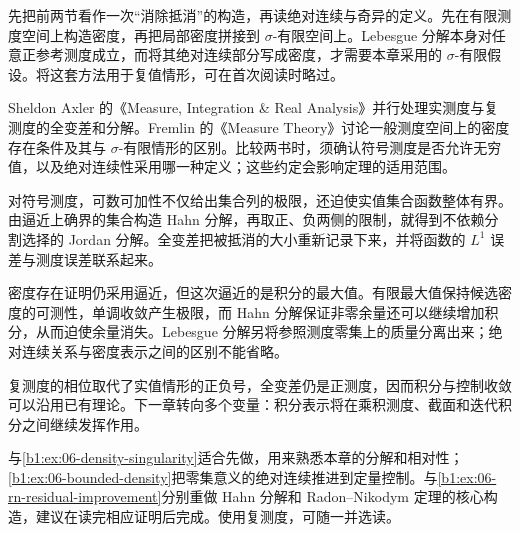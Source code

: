 先把前两节看作一次“消除抵消”的构造，再读绝对连续与奇异的定义。先在有限测度空间上构造密度，再把局部密度拼接到 \(\sigma\)-有限空间上。Lebesgue 分解本身对任意正参考测度成立，而将其绝对连续部分写成密度，才需要本章采用的 \(\sigma\)-有限假设。将这套方法用于复值情形，可在首次阅读时略过。

\ProseParagraphBreak

Sheldon Axler 的《Measure, Integration \& Real Analysis》\cite[Chapter 9]{Axler2020Measure}并行处理实测度与复测度的全变差和分解。Fremlin 的《Measure Theory》\cite[Volume 2, \S\S231--232]{Fremlin2016Measure}讨论一般测度空间上的密度存在条件及其与 \(\sigma\)-有限情形的区别。比较两书时，须确认符号测度是否允许无穷值，以及绝对连续性采用哪一种定义；这些约定会影响定理的适用范围。






\begin{chaptersummary}
对符号测度，可数可加性不仅给出集合列的极限，还迫使实值集合函数整体有界。由逼近上确界的集合构造 Hahn 分解，再取正、负两侧的限制，就得到不依赖分割选择的 Jordan 分解。全变差把被抵消的大小重新记录下来，并将函数的 \(L^1\) 误差与测度误差联系起来。

\ProseParagraphBreak

密度存在证明仍采用逼近，但这次逼近的是积分的最大值。有限最大值保持候选密度的可测性，单调收敛产生极限，而 Hahn 分解保证非零余量还可以继续增加积分，从而迫使余量消失。Lebesgue 分解另将参照测度零集上的质量分离出来；绝对连续关系与密度表示之间的区别不能省略。

\ProseParagraphBreak

复测度的相位取代了实值情形的正负号，全变差仍是正测度，因而积分与控制收敛可以沿用已有理论。下一章转向多个变量：积分表示将在乘积测度、截面和迭代积分之间继续发挥作用。
\end{chaptersummary}


\BookExercises

与\cref{b1:ex:06-density-singularity}适合先做，用来熟悉本章的分解和相对性；\cref{b1:ex:06-bounded-density}把零集意义的绝对连续推进到定量控制。与\cref{b1:ex:06-rn-residual-improvement}分别重做 Hahn 分解和 Radon--Nikodym 定理的核心构造，建议在读完相应证明后完成。使用复测度，可随一并选读。

